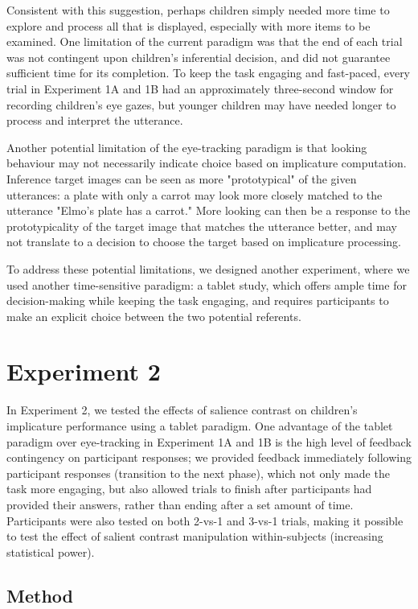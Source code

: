 \documentclass{rsos}
\begin{document}
Consistent with this suggestion, perhaps children simply needed more
time to explore and process all that is displayed, especially with more
items to be examined. One limitation of the current paradigm was that
the end of each trial was not contingent upon children's inferential
decision, and did not guarantee sufficient time for its completion. To
keep the task engaging and fast-paced, every trial in Experiment 1A and
1B had an approximately three-second window for recording children's eye
gazes, but younger children may have needed longer to process and
interpret the utterance. 

Another potential limitation of the eye-tracking paradigm is that 
looking behaviour may not necessarily indicate choice based on implicature computation. 
Inference target images can be seen as more "prototypical" of the given utterances:
a plate with only a carrot may look more closely matched to the utterance "Elmo's plate has a carrot."
More looking can then be a response to the prototypicality of the target image 
that matches the utterance better, and may not translate to a decision 
to choose the target based on implicature processing.

To address these potential limitations, we
designed another experiment, where we used another time-sensitive
paradigm: a tablet study, which offers ample time for decision-making
while keeping the task engaging, and requires participants to make an explicit choice 
between the two potential referents.

\section{Experiment 2}\label{experiment-2}

In Experiment 2, we tested the effects of salience contrast on
children's implicature performance using a tablet paradigm. One
advantage of the tablet paradigm over eye-tracking in Experiment 1A and
1B is the high level of feedback contingency on participant responses;
we provided feedback immediately following participant responses
(transition to the next phase), which not only made the task more
engaging, but also allowed trials to finish after participants had
provided their answers, rather than ending after a set amount of time.
Participants were also tested on both 2-vs-1 and 3-vs-1 trials, making
it possible to test the effect of salient contrast manipulation
within-subjects (increasing statistical power).

\subsection{Method}\label{method-2}
\end{document}
